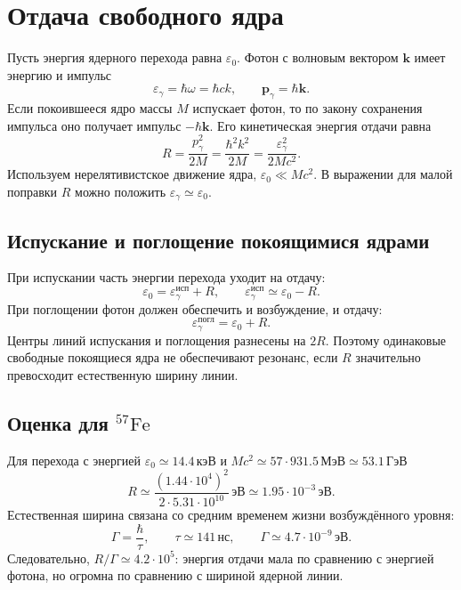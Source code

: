 \documentclass[../final.tex]{subfiles}
\begin{document}
\clearpage
\section{Отдача свободного ядра}
Пусть энергия ядерного перехода равна $\varepsilon_0$.
Фотон с волновым вектором $\mathbf k$ имеет энергию и импульс
\begin{equation*}
 \varepsilon_\gamma=\hbar\omega=\hbar ck,\qquad
 \mathbf p_\gamma=\hbar\mathbf k.
\end{equation*}
Если покоившееся ядро массы $M$ испускает фотон, то по закону сохранения
импульса оно получает импульс $-\hbar\mathbf k$.
Его кинетическая энергия отдачи равна
\begin{equation*}
 \boxed{\quad R=\frac{p_\gamma^2}{2M}
 =\frac{\hbar^2k^2}{2M}=\frac{\varepsilon_\gamma^2}{2Mc^2}.\quad}
\end{equation*}
Используем нерелятивистское движение ядра, $\varepsilon_0\ll Mc^2$.
В выражении для малой поправки $R$ можно положить
$\varepsilon_\gamma\simeq\varepsilon_0$.

\subsection{Испускание и поглощение покоящимися ядрами}
При испускании часть энергии перехода уходит на отдачу:
\begin{equation*}
 \varepsilon_0=\varepsilon_\gamma^{\text{исп}}+R,
 \qquad \varepsilon_\gamma^{\text{исп}}\simeq\varepsilon_0-R.
\end{equation*}
При поглощении фотон должен обеспечить и возбуждение, и отдачу:
\begin{equation*}
 \varepsilon_\gamma^{\text{погл}}=\varepsilon_0+R.
\end{equation*}
Центры линий испускания и поглощения разнесены на $2R$.
Поэтому одинаковые свободные покоящиеся ядра не обеспечивают резонанс,
если $R$ значительно превосходит естественную ширину линии.

\subsection{Оценка для $^{57}\mathrm{Fe}$}
Для перехода с энергией $\varepsilon_0\simeq14.4\,\text{кэВ}$
и $Mc^2\simeq57\cdot931.5\,\text{МэВ}\simeq53.1\,\text{ГэВ}$
\begin{equation*}
 R\simeq\frac{(1.44\cdot10^4)^2}{2\cdot5.31\cdot10^{10}}\,\text{эВ}
 \simeq1.95\cdot10^{-3}\,\text{эВ}.
\end{equation*}
Естественная ширина связана со средним временем жизни возбуждённого уровня:
\begin{equation*}
 \Gamma=\frac\hbar\tau,\qquad
 \tau\simeq141\,\text{нс},\qquad
 \Gamma\simeq4.7\cdot10^{-9}\,\text{эВ}.
\end{equation*}
Следовательно, $R/\Gamma\simeq4.2\cdot10^5$:
энергия отдачи мала по сравнению с энергией фотона, но огромна по сравнению
с шириной ядерной линии.
\end{document}
